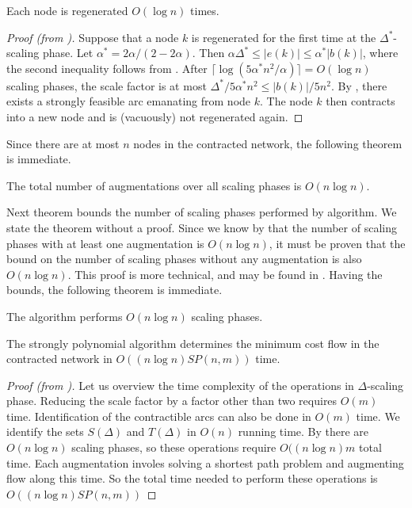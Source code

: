 \begin{lemma}
    Each node is regenerated $O(\log n)$ times.
\end{lemma}
\begin{proof}[Proof (from {\cite[p.~347]{orlin1993faster}})]
    Suppose that a node $k$ is regenerated for the first time at the $\Delta^*$-scaling phase. Let $\alpha^* = 2\alpha/(2-2\alpha)$. Then $\alpha\Delta^* \leq |e(k)| \leq \alpha^*|b(k)|$, where the second inequality follows from . After $\lceil\log(5\alpha^*n^2/\alpha)\rceil = O(\log n)$ scaling phases, the scale factor is at most $\Delta^*/5\alpha^*n^2 \leq |b(k)|/5n^2$. By , there exists a strongly feasible arc emanating from node $k$. The node $k$ then contracts into a new node and is (vacuously) not regenerated again.
\end{proof}

Since there are at most $n$ nodes in the contracted network, the following theorem is immediate.

\begin{theorem}\label{thm:augmentations_bound}
    The total number of augmentations over all scaling phases is $O(n \log n)$.
\end{theorem}

Next theorem bounds the number of scaling phases performed by algorithm. We state the theorem without a proof. Since we know by  that the number of scaling phases with at least one augmentation is $O(n \log n)$, it must be proven that the bound on the number of scaling phases without any augmentation is also $O(n\log n)$. This proof is more technical, and may be found in \cite{orlin1993faster}. Having the bounds, the following theorem is immediate.
\begin{theorem}\label{thm:scaling_phases_bound} 
    The algorithm performs $O(n \log n)$ scaling phases.
\end{theorem}

\begin{theorem}
    The strongly polynomial algorithm determines the minimum cost flow in the contracted network in $O((n\log n)SP(n,m))$ time.
\end{theorem}
\begin{proof}[Proof (from {\cite[p.~347]{orlin1993faster}})]
    Let us overview the time complexity of the operations in $\Delta$-scaling phase. Reducing the scale factor by a factor other than two requires $O(m)$ time. Identification of the contractible arcs can also be done in $O(m)$ time. We identify the sets $S(\Delta)$ and $T(\Delta)$ in $O(n)$ running time. By  there are $O(n\log n)$ scaling phases, so these operations require $O((n\log n) m$ total time.
    Each augmentation involes solving a shortest path problem and augmenting flow along this time. So the total time needed to perform these operations is $O((n \log n )SP(n,m))$
\end{proof}

